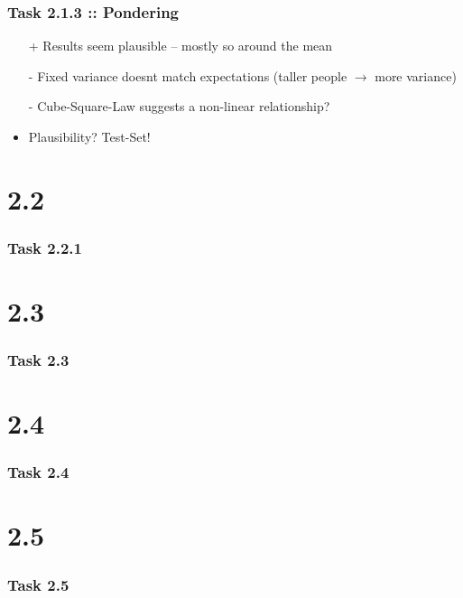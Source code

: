 \documentclass[10pt,aspectratio=169,handout]{beamer}
\begin{document}
\begin{frame}
    \frametitle{Task 2.1.3 :: Pondering}

    \begin{itemize}
        \item[+] Results seem plausible -- mostly so around the mean
        \item[-] Fixed variance doesnt match expectations (taller people $\rightarrow$ more variance)
        \item[-] Cube-Square-Law suggests a non-linear relationship?
        \item    Plausibility? Test-Set!
    \end{itemize}
\end{frame}

\section{2.2}
\begin{frame}
    \frametitle{Task 2.2.1}
    
\end{frame}

\section{2.3}
\begin{frame}
    \frametitle{Task 2.3}
\end{frame}

\section{2.4}
\begin{frame}
    \frametitle{Task 2.4}
\end{frame}

\section{2.5}
\begin{frame}
    \frametitle{Task 2.5}
\end{frame}
\end{document}
